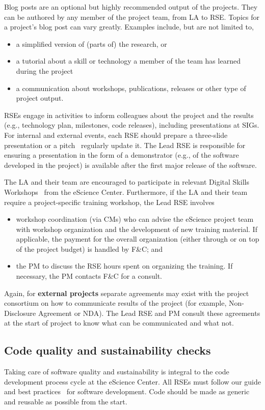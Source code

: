 \documentclass[11pt]{article}
\begin{document}
Blog posts are an optional but highly recommended output of the projects. They can be authored by any member of the
project team, from LA to RSE. Topics for a project's blog post can vary greatly. Examples
include, but are not limited to,
\begin{itemize}
\item a simplified version of (parts of) the research, or 
\item a tutorial about a skill or technology a member of the team has learned during the project
\item a communication about workshops, publications, releases or other type of project output.
\end{itemize}

RSEs engage in activities to inform colleagues about the project and the results (e.g., technology plan, milestones,
code releases), including presentations at SIGs. For internal and external events, each RSE should prepare a
three-slide presentation or a pitch~\cite{three:slides} 
regularly update it. The Lead RSE is responsible for ensuring a presentation in the form of a demonstrator (e.g., of the
software developed in the project) is available after the first major release of the software.


The LA and their team are encouraged to participate in relevant Digital Skills Workshops~\cite{digital-skills} from the eScience Center. Furthermore, if the LA and their team
require a project-specific training workshop, the Lead RSE involves
\begin{itemize}
\item workshop coordination (via CMs) who can advise the eScience project team with workshop organization and the development
of new training material. If applicable, the payment for the overall organization (either through or on top of the
project budget) is handled by F\&C; and
\item the PM to discuss the RSE hours spent on organizing the training. If necessary, the PM contacts F\&C for a consult.
\end{itemize}

Again, for \textbf{external projects} separate agreements may exist with the project consortium on how to communicate
results of the project (for example, Non-Disclosure Agreement or NDA). The Lead RSE and PM consult these agreements at
the start of project to know what can be communicated and what not.

\subsection{Code quality and sustainability checks}
Taking care of software quality and sustainability is integral to the code development process cycle at the eScience
Center. All RSEs must follow our guide and best practices~\cite{guide-nlesc} for software development. Code should be made
as generic and reusable as possible from the start.
\end{document}

